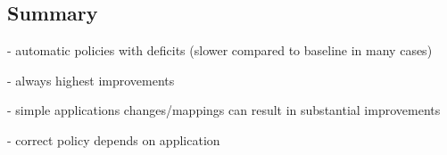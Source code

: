\subsection{Summary}


- automatic policies with deficits (slower compared to baseline in many cases)

- \TABARNAC always highest improvements

- simple applications changes/mappings can result in substantial improvements

- correct policy depends on application
